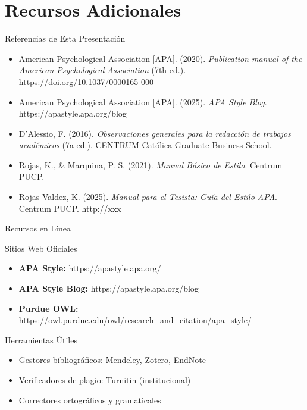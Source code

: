 \documentclass[spanish,aspectratio=169]{beamer}
\begin{document}
\section{Recursos Adicionales}

\begin{frame}{Referencias de Esta Presentación}
	\footnotesize
	\begin{itemize}
		\item American Psychological Association [APA]. (2020). \textit{Publication manual of the American Psychological Association} (7th ed.). https://doi.org/10.1037/0000165-000
		
		\item American Psychological Association [APA]. (2025). \textit{APA Style Blog}. https://apastyle.apa.org/blog
		
		\item D'Alessio, F. (2016). \textit{Observaciones generales para la redacción de trabajos académicos} (7a ed.). CENTRUM Católica Graduate Business School.
		
		\item Rojas, K., \& Marquina, P. S. (2021). \textit{Manual Básico de Estilo}. Centrum PUCP.
		
		\item Rojas Valdez, K. (2025). \textit{Manual para el Tesista: Guía del Estilo APA}. Centrum PUCP. http://xxx
	\end{itemize}
\end{frame}

\begin{frame}{Recursos en Línea}
	\begin{block}{Sitios Web Oficiales}
		\begin{itemize}
			\item \textbf{APA Style:} https://apastyle.apa.org/
			\item \textbf{APA Style Blog:} https://apastyle.apa.org/blog
			\item \textbf{Purdue OWL:} https://owl.purdue.edu/owl/research\_and\_citation/apa\_style/
		\end{itemize}
	\end{block}
	
	\begin{block}{Herramientas Útiles}
		\begin{itemize}
			\item Gestores bibliográficos: Mendeley, Zotero, EndNote
			\item Verificadores de plagio: Turnitin (institucional)
			\item Correctores ortográficos y gramaticales
		\end{itemize}
	\end{block}
\end{frame}
\end{document}
